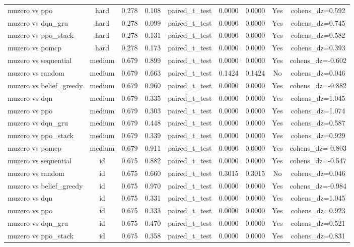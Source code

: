 \begin{table}[htbp]
\begin{tabular}{lcccccccc}
muzero vs ppo & hard & 0.278 & 0.108 & paired_t_test & 0.0000 & 0.0000 & Yes & cohens_dz=0.592 \\
muzero vs dqn_gru & hard & 0.278 & 0.099 & paired_t_test & 0.0000 & 0.0000 & Yes & cohens_dz=0.745 \\
muzero vs ppo_stack & hard & 0.278 & 0.131 & paired_t_test & 0.0000 & 0.0000 & Yes & cohens_dz=0.582 \\
muzero vs pomcp & hard & 0.278 & 0.173 & paired_t_test & 0.0000 & 0.0000 & Yes & cohens_dz=0.393 \\
muzero vs sequential & medium & 0.679 & 0.899 & paired_t_test & 0.0000 & 0.0000 & Yes & cohens_dz=-0.602 \\
muzero vs random & medium & 0.679 & 0.663 & paired_t_test & 0.1424 & 0.1424 & No & cohens_dz=0.046 \\
muzero vs belief_greedy & medium & 0.679 & 0.960 & paired_t_test & 0.0000 & 0.0000 & Yes & cohens_dz=-0.882 \\
muzero vs dqn & medium & 0.679 & 0.335 & paired_t_test & 0.0000 & 0.0000 & Yes & cohens_dz=1.045 \\
muzero vs ppo & medium & 0.679 & 0.303 & paired_t_test & 0.0000 & 0.0000 & Yes & cohens_dz=1.074 \\
muzero vs dqn_gru & medium & 0.679 & 0.448 & paired_t_test & 0.0000 & 0.0000 & Yes & cohens_dz=0.587 \\
muzero vs ppo_stack & medium & 0.679 & 0.339 & paired_t_test & 0.0000 & 0.0000 & Yes & cohens_dz=0.929 \\
muzero vs pomcp & medium & 0.679 & 0.911 & paired_t_test & 0.0000 & 0.0000 & Yes & cohens_dz=-0.803 \\
muzero vs sequential & id & 0.675 & 0.882 & paired_t_test & 0.0000 & 0.0000 & Yes & cohens_dz=-0.547 \\
muzero vs random & id & 0.675 & 0.660 & paired_t_test & 0.3015 & 0.3015 & No & cohens_dz=0.046 \\
muzero vs belief_greedy & id & 0.675 & 0.970 & paired_t_test & 0.0000 & 0.0000 & Yes & cohens_dz=-0.984 \\
muzero vs dqn & id & 0.675 & 0.331 & paired_t_test & 0.0000 & 0.0000 & Yes & cohens_dz=1.045 \\
muzero vs ppo & id & 0.675 & 0.333 & paired_t_test & 0.0000 & 0.0000 & Yes & cohens_dz=0.923 \\
muzero vs dqn_gru & id & 0.675 & 0.470 & paired_t_test & 0.0000 & 0.0000 & Yes & cohens_dz=0.521 \\
muzero vs ppo_stack & id & 0.675 & 0.358 & paired_t_test & 0.0000 & 0.0000 & Yes & cohens_dz=0.831 \\

\end{tabular}
\end{table}
